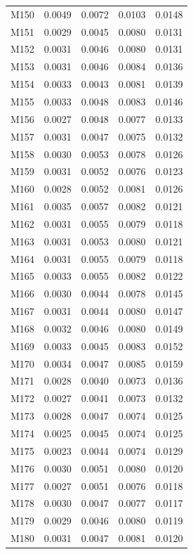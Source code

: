 \begin{longtable}{lrrrr}
M150 & 0.0049 & 0.0072 & 0.0103 & 0.0148 \\
M151 & 0.0029 & 0.0045 & 0.0080 & 0.0131 \\
M152 & 0.0031 & 0.0046 & 0.0080 & 0.0131 \\
M153 & 0.0031 & 0.0046 & 0.0084 & 0.0136 \\
M154 & 0.0033 & 0.0043 & 0.0081 & 0.0139 \\
M155 & 0.0033 & 0.0048 & 0.0083 & 0.0146 \\
M156 & 0.0027 & 0.0048 & 0.0077 & 0.0133 \\
M157 & 0.0031 & 0.0047 & 0.0075 & 0.0132 \\
M158 & 0.0030 & 0.0053 & 0.0078 & 0.0126 \\
M159 & 0.0031 & 0.0052 & 0.0076 & 0.0123 \\
M160 & 0.0028 & 0.0052 & 0.0081 & 0.0126 \\
M161 & 0.0035 & 0.0057 & 0.0082 & 0.0121 \\
M162 & 0.0031 & 0.0055 & 0.0079 & 0.0118 \\
M163 & 0.0031 & 0.0053 & 0.0080 & 0.0121 \\
M164 & 0.0031 & 0.0055 & 0.0079 & 0.0118 \\
M165 & 0.0033 & 0.0055 & 0.0082 & 0.0122 \\
M166 & 0.0030 & 0.0044 & 0.0078 & 0.0145 \\
M167 & 0.0031 & 0.0044 & 0.0080 & 0.0147 \\
M168 & 0.0032 & 0.0046 & 0.0080 & 0.0149 \\
M169 & 0.0033 & 0.0045 & 0.0083 & 0.0152 \\
M170 & 0.0034 & 0.0047 & 0.0085 & 0.0159 \\
M171 & 0.0028 & 0.0040 & 0.0073 & 0.0136 \\
M172 & 0.0027 & 0.0041 & 0.0073 & 0.0132 \\
M173 & 0.0028 & 0.0047 & 0.0074 & 0.0125 \\
M174 & 0.0025 & 0.0045 & 0.0074 & 0.0125 \\
M175 & 0.0023 & 0.0044 & 0.0074 & 0.0129 \\
M176 & 0.0030 & 0.0051 & 0.0080 & 0.0120 \\
M177 & 0.0027 & 0.0051 & 0.0076 & 0.0118 \\
M178 & 0.0030 & 0.0047 & 0.0077 & 0.0117 \\
M179 & 0.0029 & 0.0046 & 0.0080 & 0.0119 \\
M180 & 0.0031 & 0.0047 & 0.0081 & 0.0120 \\

\end{longtable}

